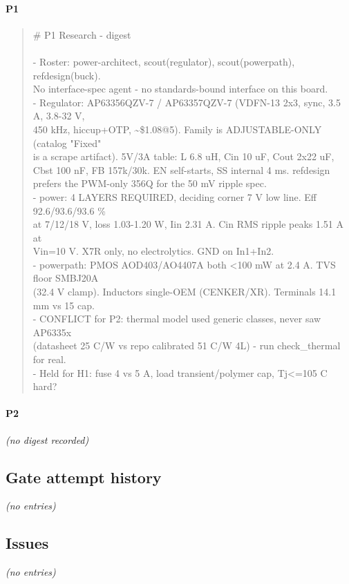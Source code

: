 \documentclass[11pt,a4paper]{article}
\begin{document}
\paragraph*{P1}
\begin{quote}\small\ttfamily\raggedright
\# P1 Research - digest\\
~\\
- Roster: power-architect, scout(regulator), scout(powerpath), refdesign(buck).\\
  No interface-spec agent - no standards-bound interface on this board.\\
- Regulator: AP63356QZV-7 / AP63357QZV-7 (VDFN-13 2x3, sync, 3.5 A, 3.8-32 V,\\
  450 kHz, hiccup+OTP, \textasciitilde{}\$1.08@5). Family is ADJUSTABLE-ONLY (catalog "Fixed"\\
  is a scrape artifact). 5V/3A table: L 6.8 uH, Cin 10 uF, Cout 2x22 uF,\\
  Cbst 100 nF, FB 157k/30k. EN self-starts, SS internal 4 ms. refdesign\\
  prefers the PWM-only 356Q for the 50 mV ripple spec.\\
- power: 4 LAYERS REQUIRED, deciding corner 7 V low line. Eff 92.6/93.6/93.6 \%\\
  at 7/12/18 V, loss 1.03-1.20 W, Iin 2.31 A. Cin RMS ripple peaks 1.51 A at\\
  Vin=10 V. X7R only, no electrolytics. GND on In1+In2.\\
- powerpath: PMOS AOD403/AO4407A both \textless{}100 mW at 2.4 A. TVS floor SMBJ20A\\
  (32.4 V clamp). Inductors single-OEM (CENKER/XR). Terminals 14.1 mm vs 15 cap.\\
- CONFLICT for P2: thermal model used generic classes, never saw AP6335x\\
  (datasheet 25 C/W vs repo calibrated 51 C/W 4L) - run check\_thermal for real.\\
- Held for H1: fuse 4 vs 5 A, load transient/polymer cap, Tj\textless{}=105 C hard?
\end{quote}
\paragraph*{P2}
\emph{(no digest recorded)}
\subsection*{Gate attempt history}
\emph{(no entries)}
\subsection*{Issues}
\emph{(no entries)}
\end{document}
